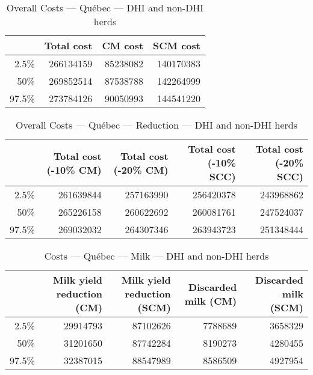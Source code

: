\documentclass{article}\usepackage[]{graphicx}\usepackage[]{color}
\begin{document}
\begin{table}[ht]
\centering
\begin{tabular}{rrrr}
  \hline
 & Total cost & CM cost & SCM cost \\ 
  \hline
2.5\% & 266134159 & 85238082 & 140170383 \\ 
  50\% & 269852514 & 87538788 & 142264999 \\ 
  97.5\% & 273784126 & 90050993 & 144541220 \\ 
   \hline
\end{tabular}
\caption{Overall Costs --- Québec --- DHI and non-DHI herds} 
\label{tab:quebec2:overall}
\end{table}
\begin{table}[ht]
\centering
\begin{tabular}{rrrrr}
  \hline
 & Total cost (-10\% CM) & Total cost (-20\% CM) & Total cost (-10\% SCC) & Total cost (-20\% SCC) \\ 
  \hline
2.5\% & 261639844 & 257163990 & 256420378 & 243968862 \\ 
  50\% & 265226158 & 260622692 & 260081761 & 247524037 \\ 
  97.5\% & 269032032 & 264307346 & 263943723 & 251348444 \\ 
   \hline
\end{tabular}
\caption{Overall Costs --- Québec --- Reduction --- DHI and non-DHI herds} 
\label{tab:quebec2:reduction}
\end{table}
\begin{table}[ht]
\centering
\begin{tabular}{rrrrr}
  \hline
 & Milk yield reduction (CM) & Milk yield reduction (SCM) & Discarded milk (CM) & Discarded milk (SCM) \\ 
  \hline
2.5\% & 29914793 & 87102626 & 7788689 & 3658329 \\ 
  50\% & 31201650 & 87742284 & 8190273 & 4280455 \\ 
  97.5\% & 32387015 & 88547989 & 8586509 & 4927954 \\ 
   \hline
\end{tabular}
\caption{Costs --- Québec --- Milk --- DHI and non-DHI herds} 
\label{tab:quebec2:a}
\end{table}
\end{document}
